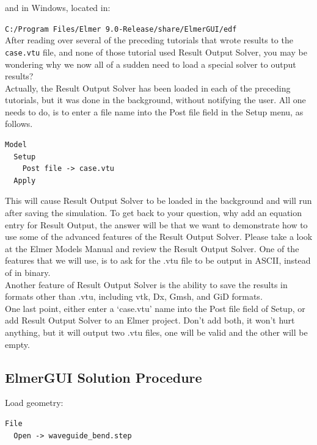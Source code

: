 and in Windows, located in:

\texttt{C:/Program Files/Elmer 9.0-Release/share/ElmerGUI/edf}\\

After reading over several of the preceding tutorials that wrote results to the \texttt{case.vtu} file, and none of those tutorial used Result Output Solver, you may be wondering why we now all of a sudden need to load a special solver to output results?\\

Actually, the Result Output Solver has been loaded in each of the preceding tutorials, but it was done in the background, without notifying the user.  All one needs to do, is to enter a file name into the Post file field in the Setup menu, as follows.

\begin{verbatim}
Model
  Setup
    Post file -> case.vtu
  Apply
\end{verbatim}

This will cause Result Output Solver to be loaded in the background and will run after saving the simulation.  To get back to your question, why add an equation entry for Result Output, the answer will be that we want to demonstrate how to use some of the advanced features of the Result Output Solver.  Please take a look at the Elmer Models Manual and review the Result Output Solver.  One of the features that we will use, is to ask for the .vtu file to be output in ASCII, instead of in binary.\\

Another feature of Result Output Solver is the ability to save the results in formats other than .vtu, including vtk, Dx, Gmsh, and GiD formats.\\

One last point, either enter a `case.vtu' name into the Post file field of Setup, or add Result Output Solver to an Elmer project.  Don't add both, it won't hurt anything, but it will output two .vtu files, one will be valid and the other will be empty.\\

\subsection*{ElmerGUI Solution Procedure}

Load geometry:
\begin{verbatim}
File
  Open -> waveguide_bend.step
\end{verbatim}

